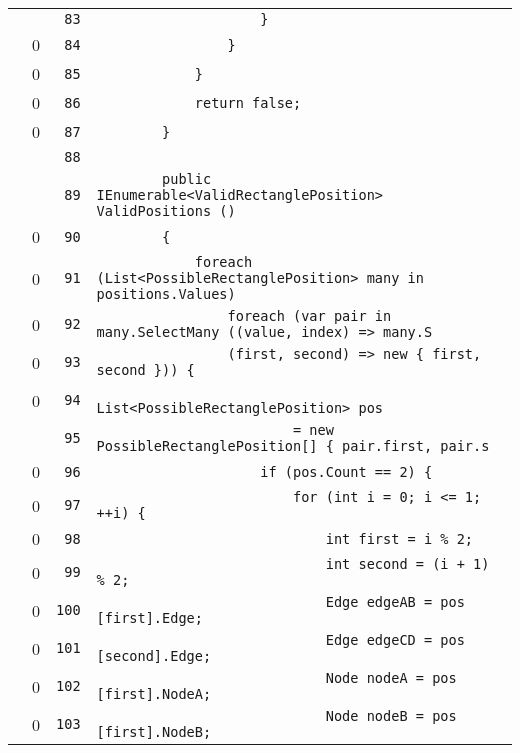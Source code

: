 \documentclass[a4paper,10pt]{article}
\begin{document}
\begin{longtable}[l]{lrrl}
\cellcolor{gray} &  & \verb~83~ & \verb~                    }~\\
\cellcolor{red} & 0 & \verb~84~ & \verb~                }~\\
\cellcolor{red} & 0 & \verb~85~ & \verb~            }~\\
\cellcolor{red} & 0 & \verb~86~ & \verb~            return false;~\\
\cellcolor{red} & 0 & \verb~87~ & \verb~        }~\\
\cellcolor{gray} &  & \verb~88~ & \verb~~\\
\cellcolor{gray} &  & \verb~89~ & \verb~        public IEnumerable<ValidRectanglePosition> ValidPositions ()~\\
\cellcolor{red} & 0 & \verb~90~ & \verb~        {~\\
\cellcolor{red} & 0 & \verb~91~ & \verb~            foreach (List<PossibleRectanglePosition> many in positions.Values)~\\
\cellcolor{red} & 0 & \verb~92~ & \verb~                foreach (var pair in many.SelectMany ((value, index) => many.S~\\
\cellcolor{red} & 0 & \verb~93~ & \verb~                (first, second) => new { first, second })) {~\\
\cellcolor{red} & 0 & \verb~94~ & \verb~                    List<PossibleRectanglePosition> pos~\\
\cellcolor{gray} &  & \verb~95~ & \verb~                        = new PossibleRectanglePosition[] { pair.first, pair.s~\\
\cellcolor{red} & 0 & \verb~96~ & \verb~                    if (pos.Count == 2) {~\\
\cellcolor{red} & 0 & \verb~97~ & \verb~                        for (int i = 0; i <= 1; ++i) {~\\
\cellcolor{red} & 0 & \verb~98~ & \verb~                            int first = i % 2;~\\
\cellcolor{red} & 0 & \verb~99~ & \verb~                            int second = (i + 1) % 2;~\\
\cellcolor{red} & 0 & \verb~100~ & \verb~                            Edge edgeAB = pos [first].Edge;~\\
\cellcolor{red} & 0 & \verb~101~ & \verb~                            Edge edgeCD = pos [second].Edge;~\\
\cellcolor{red} & 0 & \verb~102~ & \verb~                            Node nodeA = pos [first].NodeA;~\\
\cellcolor{red} & 0 & \verb~103~ & \verb~                            Node nodeB = pos [first].NodeB;~\\

\end{longtable}
\end{document}
